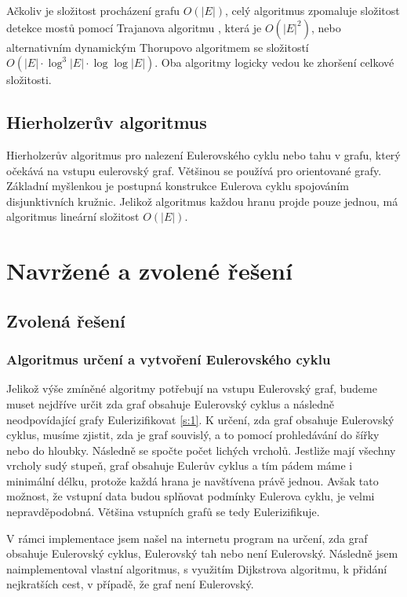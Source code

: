 \documentclass[12pt, a4paper]{article}
\begin{document}
Ačkoliv je složitost procházení grafu $O(|E|)$, celý algoritmus zpomaluje složitost detekce mostů pomocí Trajanova algoritmu \cite{Tarjan}, která je $O(|E|^2)$, nebo alternativním dynamickým Thorupovo algoritmem \cite{Thorup} se složitostí \newline \noindent $O(|E| \cdot \log^3 |E| \cdot \log \log |E|)$. Oba algoritmy logicky vedou ke zhoršení celkové složitosti.

\subsection{Hierholzerův algoritmus}
Hierholzerův algoritmus \cite{Eulerian, Hierholzer} pro nalezení Eulerovského cyklu nebo tahu v grafu, který očekává na vstupu eulerovský graf. Většinou se používá pro orientované grafy. Základní myšlenkou je postupná konstrukce Eulerova cyklu spojováním disjunktivních kružnic. Jelikož algoritmus každou hranu projde pouze jednou, má algoritmus lineární složitost $O(|E|)$.

\section{Navržené a zvolené řešení}
\label{s:2}
\subsection{Zvolená řešení}

\subsubsection{Algoritmus určení a vytvoření Eulerovského cyklu}
Jelikož výše zmíněné algoritmy potřebují na vstupu Eulerovský graf, budeme muset nejdříve určit zda graf obsahuje Eulerovský cyklus a následně neodpovídající grafy Eulerizifikovat \ref{s:1}. K určení, zda graf obsahuje Eulerovský cyklus, musíme zjistit, zda je graf souvislý, a to pomocí prohledávání do šířky nebo do hloubky. Následně se spočte počet lichých vrcholů. Jestliže mají všechny vrcholy sudý stupeň, graf obsahuje Eulerův cyklus a tím pádem máme i minimální délku, protože každá hrana je navštívena právě jednou. Avšak tato možnost, že vstupní data budou splňovat podmínky Eulerova cyklu, je velmi nepravděpodobná. Většina vstupních grafů se tedy Eulerizifikuje. 

V rámci implementace jsem našel na internetu program \cite{Geeks} na určení, zda graf obsahuje Eulerovský cyklus, Eulerovský tah nebo není Eulerovský. Následně jsem naimplementoval vlastní algoritmus, s využitím Dijkstrova algoritmu, k přidání nejkratších cest, v případě, že graf není Eulerovský.
\end{document}
